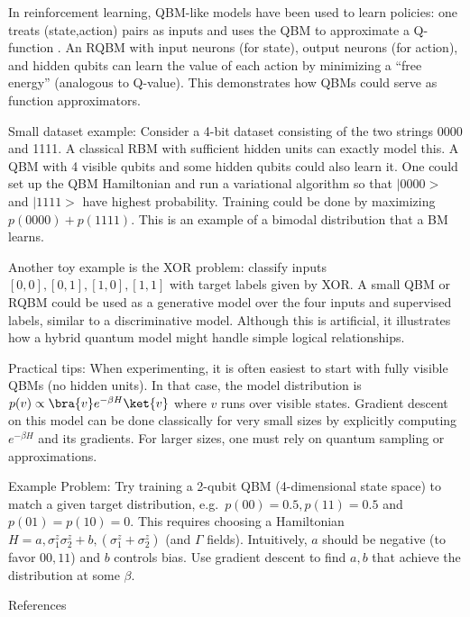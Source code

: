 In reinforcement learning, QBM-like models have been used to learn policies: one treats (state,action) pairs as inputs and uses the QBM to approximate a Q-function .  An RQBM with input neurons (for state), output neurons (for action), and hidden qubits can learn the value of each action by minimizing a “free energy” (analogous to Q-value).  This demonstrates how QBMs could serve as function approximators.



Small dataset example: Consider a 4-bit dataset consisting of the two strings 0000 and 1111. A classical RBM with sufficient hidden units can exactly model this. A QBM with 4 visible qubits and some hidden qubits could also learn it. One could set up the QBM Hamiltonian and run a variational algorithm so that $|0000>$ and $|1111>$ have highest probability.  Training could be done by maximizing $p(0000)+p(1111)$. This is an example of a bimodal distribution that a BM learns.



Another toy example is the XOR problem: classify inputs $[0,0],[0,1],[1,0],[1,1]$ with target labels given by XOR. A small QBM or RQBM could be used as a generative model over the four inputs and supervised labels, similar to a discriminative model. Although this is artificial, it illustrates how a hybrid quantum model might handle simple logical relationships.



Practical tips: When experimenting, it is often easiest to start with fully visible QBMs (no hidden units). In that case, the model distribution is $p(v) \propto \bra{v}e^{-\beta H}\ket{v}$ where $v$ runs over visible states. Gradient descent on this model can be done classically for very small sizes by explicitly computing $e^{-\beta H}$ and its gradients. For larger sizes, one must rely on quantum sampling or approximations.



Example Problem: Try training a 2-qubit QBM (4-dimensional state space) to match a given target distribution, e.g.\ $p(00)=0.5, p(11)=0.5$ and $p(01)=p(10)=0$. This requires choosing a Hamiltonian $H = a,\sigma^z_1\sigma^z_2 + b,(\sigma^z_1+\sigma^z_2)$ (and $\Gamma$ fields). Intuitively, $a$ should be negative (to favor $00,11$) and $b$ controls bias. Use gradient descent to find $a,b$ that achieve the distribution at some $\beta$.





References





